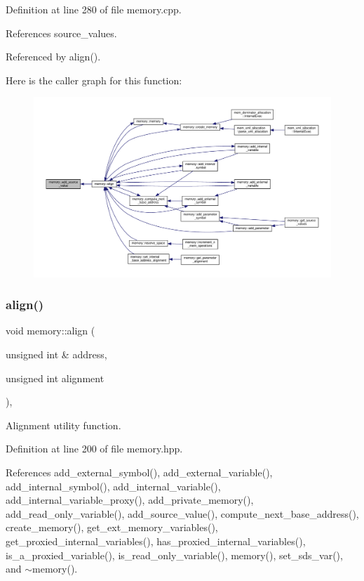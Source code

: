 Definition at line 280 of file memory.\+cpp.



References source\+\_\+values.



Referenced by align().

Here is the caller graph for this function\+:
\nopagebreak
\begin{figure}[H]
\begin{center}
\leavevmode
\includegraphics[width=350pt]{d8/d99/classmemory_a3a39a28a6df6b3815a2fa061bb943ceb_icgraph}
\end{center}
\end{figure}
\mbox{\label{classmemory_a30018e73a41b777c95319b62cfc79b81}} 
\subsubsection{\texorpdfstring{align()}{align()}}
{\footnotesize\ttfamily void memory\+::align (\begin{DoxyParamCaption}\item[{unsigned int \&}]{address,  }\item[{unsigned int}]{alignment }\end{DoxyParamCaption})\hspace{0.3cm}{\ttfamily [inline]}, {\ttfamily [private]}}



Alignment utility function. 



Definition at line 200 of file memory.\+hpp.



References add\+\_\+external\+\_\+symbol(), add\+\_\+external\+\_\+variable(), add\+\_\+internal\+\_\+symbol(), add\+\_\+internal\+\_\+variable(), add\+\_\+internal\+\_\+variable\+\_\+proxy(), add\+\_\+private\+\_\+memory(), add\+\_\+read\+\_\+only\+\_\+variable(), add\+\_\+source\+\_\+value(), compute\+\_\+next\+\_\+base\+\_\+address(), create\+\_\+memory(), get\+\_\+ext\+\_\+memory\+\_\+variables(), get\+\_\+proxied\+\_\+internal\+\_\+variables(), has\+\_\+proxied\+\_\+internal\+\_\+variables(), is\+\_\+a\+\_\+proxied\+\_\+variable(), is\+\_\+read\+\_\+only\+\_\+variable(), memory(), set\+\_\+sds\+\_\+var(), and $\sim$memory().



